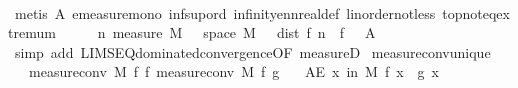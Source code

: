 \begin{isabellebody}
\ \ \ \ \isamarkupfalse%
\ {\isacharparenleft}{\kern0pt}metis\ A\ emeasure{\isacharunderscore}{\kern0pt}mono\ inf{\isacharunderscore}{\kern0pt}sup{\isacharunderscore}{\kern0pt}ord{\isacharparenleft}{\kern0pt}{}{\isacharparenright}{\kern0pt}\ infinity{\isacharunderscore}{\kern0pt}ennreal{\isacharunderscore}{\kern0pt}def\ linorder{\isacharunderscore}{\kern0pt}not{\isacharunderscore}{\kern0pt}less\ top{\isachardot}{\kern0pt}not{\isacharunderscore}{\kern0pt}eq{\isacharunderscore}{\kern0pt}extremum{\isacharparenright}{\kern0pt}\isanewline
\ \ \isamarkupfalse%
\ \isamarkupfalse%
\ {\isachardoublequoteopen}{\isacharparenleft}{\kern0pt}{\isasymlambda}n{\isachardot}{\kern0pt}\ measure\ M\ {\isacharparenleft}{\kern0pt}{\isacharbraceleft}{\kern0pt}{\isasymomega}\ {\isasymin}\ space\ M{\isachardot}{\kern0pt}\ {\isasymepsilon}\ {\isacharless}{\kern0pt}\ dist\ {\isacharparenleft}{\kern0pt}f{\isacharprime}{\kern0pt}\ n\ {\isasymomega}{\isacharparenright}{\kern0pt}\ {\isacharparenleft}{\kern0pt}f\ {\isasymomega}{\isacharparenright}{\kern0pt}{\isacharbraceright}{\kern0pt}\ {\isasyminter}\ A{\isacharparenright}{\kern0pt}{\isacharparenright}{\kern0pt}\ {\isasymlonglonglongrightarrow}\ {}{\isachardoublequoteclose}\isanewline
\ \ \ \ \isamarkupfalse%
\ {\isacharparenleft}{\kern0pt}simp\ add{\isacharcolon}{\kern0pt}\ LIMSEQ{\isacharunderscore}{\kern0pt}dominated{\isacharunderscore}{\kern0pt}convergence{\isacharbrackleft}{\kern0pt}OF\ measure{\isacharunderscore}{\kern0pt}D{\isacharunderscore}{\kern0pt}{}{\isacharbrackright}{\kern0pt}{\isacharparenright}{\kern0pt}\isanewline
{}\isamarkupfalse%
%
\endisatagproof
{\isafoldproof}%
%
\isadelimproof
\isanewline
%
\endisadelimproof
\isanewline
{}\isamarkupfalse%
\ measure{\isacharunderscore}{\kern0pt}conv{\isacharunderscore}{\kern0pt}unique{\isacharcolon}{\kern0pt}\isanewline
\ \ \ {\isachardoublequoteopen}measure{\isacharunderscore}{\kern0pt}conv\ M\ f{\isacharprime}{\kern0pt}\ f{\isachardoublequoteclose}\ {\isachardoublequoteopen}measure{\isacharunderscore}{\kern0pt}conv\ M\ f{\isacharprime}{\kern0pt}\ g{\isachardoublequoteclose}\isanewline
\ \ \ {\isachardoublequoteopen}AE\ x\ in\ M{\isachardot}{\kern0pt}\ f\ x\ {\isacharequal}{\kern0pt}\ g\ x{\isachardoublequoteclose}\isanewline
%
\isadelimproof
%
\endisadelimproof
%
\isatagproof
{}\isamarkupfalse%
\ {\isacharminus}{\kern0pt}\isanewline
\ \ \isamarkupfalse%
%
\endisatagproof
{\isafoldproof}%

\end{isabellebody}

